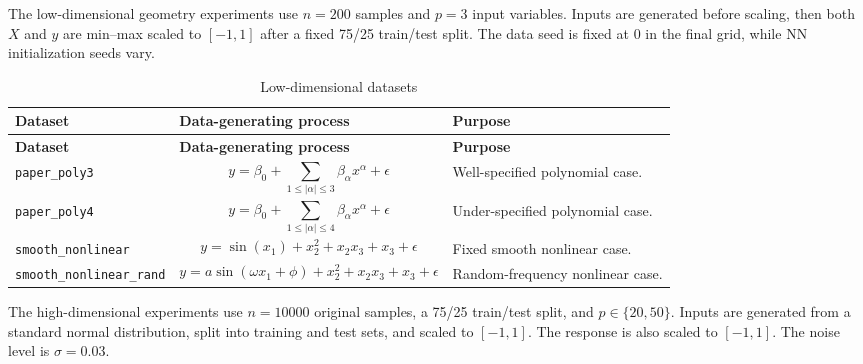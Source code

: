 \documentclass[]{interact}
\theoremstyle{plain}
\theoremstyle{definition}
\theoremstyle{remark}
\begin{document}
The low-dimensional geometry experiments use $n=200$ samples and $p=3$ input variables. Inputs are generated before scaling, then both $X$ and $y$ are min--max scaled to $[-1,1]$ after a fixed 75/25 train/test split. The data seed is fixed at 0 in the final grid, while NN initialization seeds vary.

\begin{longtable}{p{}p{}p{}}
\caption{Low-dimensional datasets}
\label{tab:lowdim-datasets} \\
\toprule
\textbf{Dataset} & \textbf{Data-generating process} & \textbf{Purpose} \\
\midrule
\endfirsthead

\toprule
\textbf{Dataset} & \textbf{Data-generating process} & \textbf{Purpose} \\
\midrule
\endhead

\bottomrule
\endlastfoot

\texttt{paper\_poly3}
&
\[
y=\beta_0+\sum_{1\leq |\alpha|\leq 3}\beta_{\alpha}x^{\alpha}+\epsilon
\]
& Well-specified polynomial case. \\

\addlinespace[0.4em]

\texttt{paper\_poly4}
&
\[
y=\beta_0+\sum_{1\leq |\alpha|\leq 4}\beta_{\alpha}x^{\alpha}+\epsilon
\]
& Under-specified polynomial case. \\

\addlinespace[0.4em]

\texttt{smooth\_nonlinear}
&
\[
y=\sin(x_1)+x_2^2+x_2x_3+x_3+\epsilon
\]
& Fixed smooth nonlinear case. \\

\addlinespace[0.4em]

\texttt{smooth\_nonlinear\_rand}
&
\[
y=a\sin(\omega x_1+\phi)+x_2^2+x_2x_3+x_3+\epsilon
\]
& Random-frequency nonlinear case. \\

\end{longtable}


The high-dimensional experiments use $n=10000$ original samples, a 75/25 train/test split, and $p\in\{20,50\}$. Inputs are generated from a standard normal distribution, split into training and test sets, and scaled to $[-1,1]$. The response is also scaled to $[-1,1]$. The noise level is $\sigma=0.03$.
\end{document}
